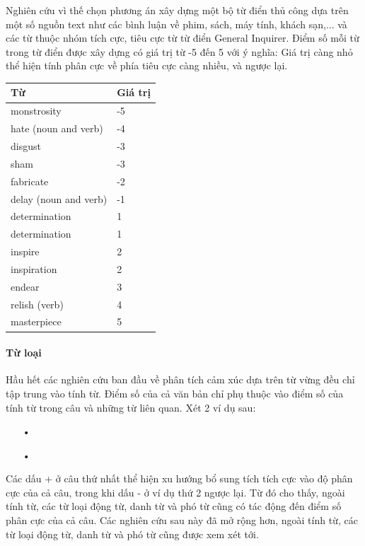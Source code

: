 Nghiên cứu \cite{taboada2011lexicon} vì thế chọn phương án xây dựng một bộ từ điển thủ công dựa trên một số nguồn text như các bình luận về phim, sách, máy tính, khách sạn,... và các từ thuộc nhóm tích cực, tiêu cực từ từ điển General Inquirer. Điểm số mỗi từ trong từ điển được xây dựng có giá trị từ -5 đến 5 với ý nghĩa: Giá trị càng nhỏ thể hiện tính phân cực về phía tiêu cực càng nhiều, và ngược lại. 
\begin{table}[H]
\begin{tabular}{l l}
\hline
\textbf{Từ} & \textbf{Giá trị} 
\\ \hline
monstrosity & -5
\\ 
hate (noun and verb) & -4
\\ 
disgust & -3
\\ 
sham & -3
\\ 
fabricate & -2
\\ 
delay (noun and verb) & -1
\\
determination & 1
\\
determination & 1
\\ 
inspire & 2
\\ 
inspiration & 2
\\ 
endear & 3
\\ 
relish (verb) & 4
\\ 
masterpiece & 5
\\ \hline
\end{tabular}
\end{table}
\paragraph*{Từ loại}
Hầu hết các nghiên cứu ban đầu về phân tích cảm xúc dựa trên từ vừng đều chỉ tập trung vào tính từ. Điểm số của cả văn bản chỉ phụ thuộc vào điểm số của tính từ trong câu và những từ liên quan. 
Xét 2 ví dụ sau: 
\begin{itemize}
\item[•] 
\item[•] 
\end{itemize}
Các dấu + ở câu thứ nhất thể hiện xu hướng bổ sung tích tích cực vào độ phân cực của cả câu, trong khi dấu - ở ví dụ thứ 2 ngược lại. Từ đó cho thấy, ngoài tính từ, các từ loại động từ, danh từ và phó từ cũng có tác động đến điểm số phân cực của cả câu. Các nghiên cứu sau này đã mở rộng hơn, ngoài tính từ, các từ loại động từ, danh từ và phó từ cũng được xem xét tới. \\

